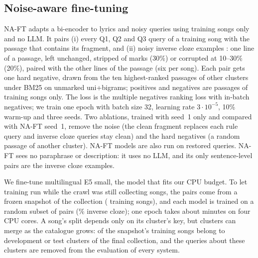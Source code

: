 \documentclass[11pt]{article}
\newcommand{\Qone}{Q1\xspace}
\newcommand{\Qtwo}{Q2\xspace}
\newcommand{\Qthree}{Q3\xspace}
\begin{document}
\subsection{Noise-aware fine-tuning}\label{sec:naft}
NA-FT adapts a bi-encoder to lyrics and noisy queries using training songs only and no LLM. It pairs
(i) every \Qone, \Qtwo{} and \Qthree{} query of a training song with the passage that contains its fragment,
and (ii) noisy inverse cloze examples \citep{lee2019ict}: one line of a passage, left unchanged, stripped of
marks (30\%) or corrupted at 10--30\% (20\%), paired with the other lines of the passage (six per song).
Each pair gets one hard negative, drawn from the ten highest-ranked passages of other clusters under BM25 on
unmarked uni+bigrams; positives and negatives are passages of training songs only. The loss is the multiple negatives ranking loss \citep{henderson2017smartreply} with
in-batch negatives; we train one epoch with batch size 32, learning rate $3\cdot10^{-5}$, 10\% warm-up and
three seeds. Two ablations, trained with seed~1 only and compared with NA-FT seed~1, remove the noise (the
clean fragment replaces each rule query and inverse cloze queries stay clean) and the hard negatives (a random
passage of another cluster). NA-FT models are also run on restored queries. NA-FT sees no paraphrase or
description: it uses no LLM, and its only sentence-level pairs are the inverse cloze examples.

We fine-tune multilingual E5 small, the model that fits our CPU budget. To let training run while the
crawl was still collecting songs, the pairs come from a frozen snapshot of the collection
(\NaftSnapshotSongs{} training songs), and each model is trained on a random subset of \NaftExamples{}
pairs (\NaftIctShare\% inverse cloze); one epoch takes about \NaftTrainMinutes{} minutes on four CPU cores.
A song's split depends only on its cluster's key, but clusters can merge as the catalogue grows:
\NaftMovedSongs{} of the snapshot's training songs belong to development or test clusters of the final
collection, and the \NaftDroppedQueries{} queries about these clusters are removed from the evaluation of
every system.
\end{document}

